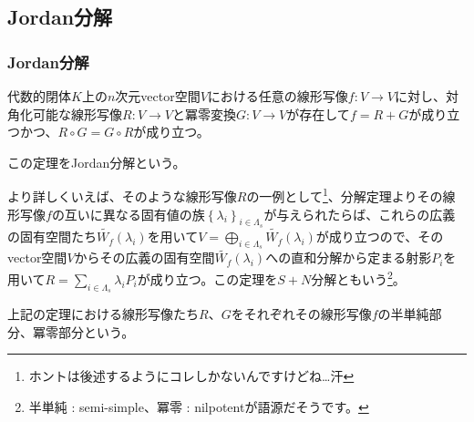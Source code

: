 \documentclass[dvipdfmx]{jsarticle}
\begin{document}
\subsection{Jordan分解}%
\subsubsection{Jordan分解}%
\begin{thm}[Jordan分解]\label{2.2.7.1}
代数的閉体$K$上の$n$次元vector空間$V$における任意の線形写像$f:V \rightarrow V$に対し、対角化可能な線形写像$R:V \rightarrow V$と冪零変換$G:V \rightarrow V$が存在して$f = R + G$が成り立つかつ、$R \circ G = G \circ R$が成り立つ。\par
この定理をJordan分解という。
\end{thm}\par
より詳しくいえば、そのような線形写像$R$の一例として\footnote{ホントは後述するようにコレしかないんですけどね…汗}、分解定理よりその線形写像$f$の互いに異なる固有値の族$\left\{ \lambda_{i} \right\}_{i \in \varLambda_{s}}$が与えられたらば、これらの広義の固有空間たち$\widetilde{W_{f}}\left( \lambda_{i} \right)$を用いて$V = \bigoplus_{i \in \varLambda_{s}} {\widetilde{W_{f}}\left( \lambda_{i} \right)}$が成り立つので、そのvector空間$V$からその広義の固有空間$\widetilde{W_{f}}\left( \lambda_{i} \right)$への直和分解から定まる射影$P_{i}$を用いて$R = \sum_{i \in \varLambda_{s}} {\lambda_{i}P_{i}}$が成り立つ。この定理を$S + N$分解ともいう\footnote{半単純 : semi-simple、冪零 : nilpotentが語源だそうです。}。
\begin{dfn}
上記の定理における線形写像たち$R$、$G$をそれぞれその線形写像$f$の半単純部分、冪零部分という。
\end{dfn}
\end{document}
